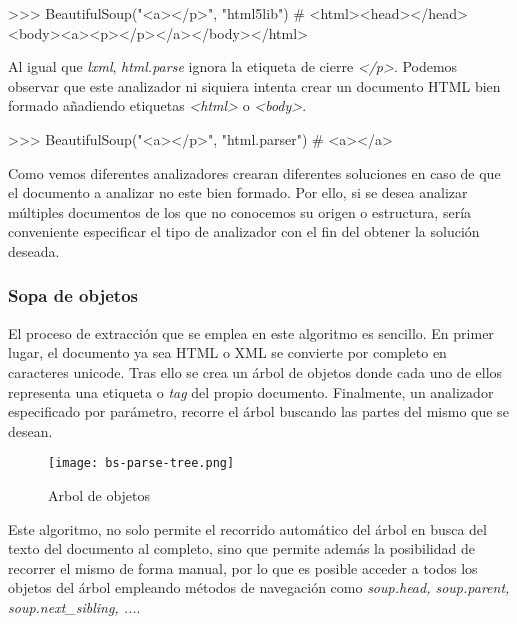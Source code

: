 \begin{Schunk}
  \begin{Soutput}
    >>> BeautifulSoup("<a></p>", "html5lib")
    # <html><head></head><body><a><p></p></a></body></html>
  \end{Soutput}
\end{Schunk}

Al igual que \emph{lxml}, \emph{html.parse} ignora la etiqueta de cierre \emph{</p>}. Podemos observar que 
este analizador ni siquiera intenta crear un documento HTML bien formado añadiendo etiquetas \emph{<html>} 
o \emph{<body>}.

\begin{Schunk}
  \begin{Soutput}
    >>> BeautifulSoup("<a></p>", "html.parser")
    # <a></a>
  \end{Soutput}
\end{Schunk}

Como vemos diferentes analizadores crearan diferentes soluciones en caso de que el documento a analizar no 
este bien formado. Por ello, si se desea analizar múltiples documentos de los que no conocemos su origen o 
estructura, sería conveniente especificar el tipo de analizador con el fin del obtener la solución deseada.

\subsubsection{Sopa de objetos}
\label{subsubsec:sopa de objetos}

El proceso de extracción que se emplea en este algoritmo es sencillo. En primer lugar, el documento ya sea 
HTML o XML se convierte por completo en caracteres unicode. Tras ello se crea un árbol de objetos donde 
cada uno de ellos representa una etiqueta o \emph{tag} del propio documento. Finalmente, un analizador 
especificado por parámetro, recorre el árbol buscando las partes del mismo que se desean.

\begin{figure}[tphb]
  \centering
  \texttt{[image: bs-parse-tree.png]}
  \caption{Arbol de objetos}
  \label{img:arbol de objetos}
\end{figure}

Este algoritmo, no solo permite el recorrido automático del árbol en busca del texto del documento al
completo, sino que permite además la posibilidad de recorrer el mismo de forma manual, por lo que es posible
acceder a todos los objetos del árbol empleando métodos de navegación como \emph{soup.head, soup.parent,
soup.next\_sibling, ...}.

